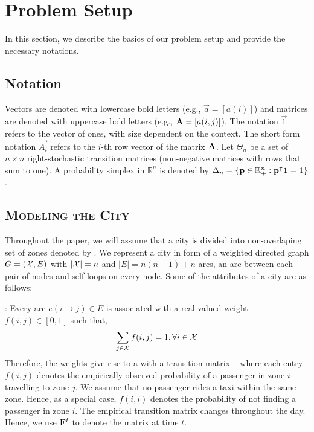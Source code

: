 
\section{Problem Setup}
\label{sec:problem_setup}

In this section, we describe the basics of our problem setup and provide the necessary notations.

\subsection{Notation}
\label{sec:notation}

Vectors are denoted with lowercase bold letters (e.g., $\vec{a} = [a(i)]$) and matrices are denoted with uppercase bold letters (e.g., $\mathbf{A} = [a(i,j)]$). The notation $\vec{1}$ refers to the vector of ones, with size dependent on the context. The short form notation $\vec{A_i}$ refers to the $i$-th row vector of the matrix $\mathbf{A}$. Let $\Theta_n$ be a set of $n \times n$ right-stochastic transition matrices (non-negative matrices with rows that sum to one). A probability simplex in $\mathbb{R}^n$ is denoted by $\Delta_n = \{\mathbf{p} \in \mathbb{R}^n_+ : \mathbf{p}^\intercal \mathbf{1} = 1 \}$.


\subsection{\textsc{Modeling the City}}

Throughout the paper, we will assume that a city is divided into non-overlaping set of zones denoted by \cityzones. 
We represent a city in form of a weighted directed graph $G=(\mathcal{X}, E)$ with 
$|\mathcal{X}| = n$ and $|E| = n(n-1) + n$ arcs, an arc between each pair of nodes and self loops on every node. 
Some of the attributes of a city are as follows:


:
Every arc $e(i\rightarrow j) \in E$ is associated with a real-valued weight $f(i,j) \in [0,1]$ such that,
\begin{equation}
	\sum_{j \in \mathcal{X}} f(i,j) = 1, \forall i \in \mathcal{X}
\end{equation}
Therefore, the weights give rise to a {\markovchain} with a transition matrix {\empiricaltransitionmatrix} -- 
where each entry $f(i,j)$ 
denotes the empirically observed probability of a passenger in zone $i$
travelling to zone $j$. We assume that no passenger rides a taxi within the same zone. Hence, as a special case, 
$f(i,i)$ denotes the probability of not finding a passenger in zone $i$. The empirical transition matrix {\empiricaltransitionmatrix}
changes throughout the day. Hence, we use ${\mathbf{F}}^t$ to denote the matrix at time $t$.

